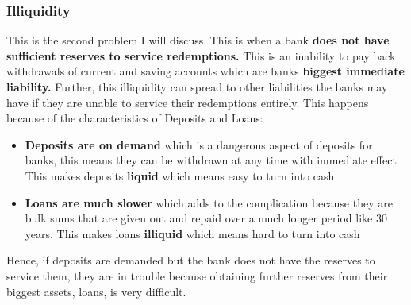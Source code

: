 \documentclass[12pt, letterpaper]{article}
\begin{document}
\subsubsection{Illiquidity}
This is the second problem I will discuss. This is when a bank \textbf{does not have sufficient reserves to service redemptions.} This is an inability to pay back withdrawals of current and saving accounts which are banks \textbf{biggest immediate liability.} Further, this illiquidity can spread to other liabilities the banks may have if they are unable to service their redemptions entirely. This happens because of the characteristics of Deposits and Loans:
\begin{itemize}
	\item \textbf{Deposits are on demand} which is a dangerous aspect of deposits for banks, this means they can be withdrawn at any time with immediate effect. This makes deposits \textbf{liquid} which means easy to turn into cash
	\item \textbf{Loans are much slower} which adds to the complication because they are bulk sums that are given out and repaid over a much longer period like 30 years. This makes loans \textbf{illiquid} which means hard to turn into cash
\end{itemize}
Hence, if deposits are demanded but the bank does not have the reserves to service them, they are in trouble because obtaining further reserves from their biggest assets, loans, is very difficult.
\end{document}

